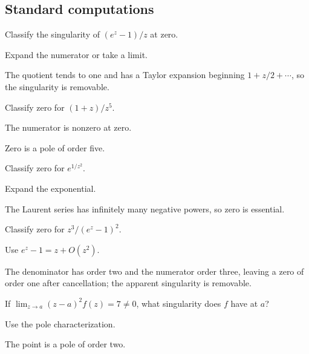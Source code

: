\subsection*{Standard computations}

\begin{exercise}\label{exr:iv09-expand-01}
Classify the singularity of \((e^z-1)/z\) at zero.
\end{exercise}
\begin{hint}
Expand the numerator or take a limit.
\end{hint}
\begin{solution}
The quotient tends to one and has a Taylor expansion beginning \(1+z/2+\cdots\), so the singularity is removable.
\end{solution}

\begin{exercise}\label{exr:iv09-expand-02}
Classify zero for \((1+z)/z^5\).
\end{exercise}
\begin{hint}
The numerator is nonzero at zero.
\end{hint}
\begin{solution}
Zero is a pole of order five.
\end{solution}

\begin{exercise}\label{exr:iv09-expand-03}
Classify zero for \(e^{1/z^2}\).
\end{exercise}
\begin{hint}
Expand the exponential.
\end{hint}
\begin{solution}
The Laurent series has infinitely many negative powers, so zero is essential.
\end{solution}

\begin{exercise}\label{exr:iv09-expand-04}
Classify zero for \(z^3/(e^z-1)^2\).
\end{exercise}
\begin{hint}
Use \(e^z-1=z+O(z^2)\).
\end{hint}
\begin{solution}
The denominator has order two and the numerator order three, leaving a zero of order one after cancellation; the apparent singularity is removable.
\end{solution}

\begin{exercise}\label{exr:iv09-expand-05}
If \(\lim_{z\to a}(z-a)^2f(z)=7\ne0\), what singularity does \(f\) have at \(a\)?
\end{exercise}
\begin{hint}
Use the pole characterization.
\end{hint}
\begin{solution}
The point is a pole of order two.
\end{solution}

